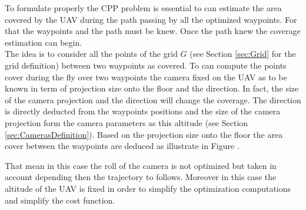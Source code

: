 To formulate properly the CPP problem is essential to can estimate the area covered by the UAV during the path passing by all the optimized waypoints. For that the waypoints and the path must be knew. 
 Once the path knew the coverage estimation can begin. \\
 The idea is to consider all the points of the grid $G$ (see Section \ref{sec:Grid} for the grid definition) between two waypoints as covered. To can compute the points cover during the fly over two waypoints the camera fixed on the UAV as to be known in term of projection size onto the floor and the direction. In fact, the size of the camera projection and the direction will change the coverage. The direction is directly deducted from the waypoints positions and the size of the camera projection form the camera parameters as this altitude (see Section \ref{sec:CamerasDefinition}). Based on the projection size onto the floor the area cover between the waypoints are deduced as illustrate in Figure .

 
 That mean in this case the roll of the camera is not optimized but taken in account depending then the trajectory to follows. Moreover in this case the altitude of the UAV is fixed in order to simplify the optimization computations and simplify the cost function.

